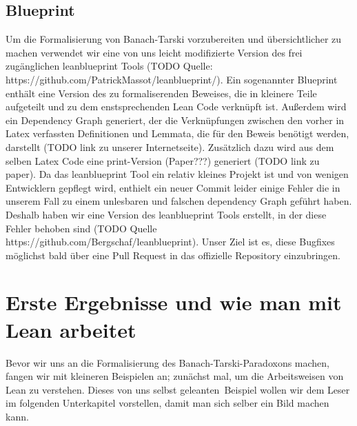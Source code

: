 \documentclass[10pt]{article}
\begin{document}
\subsection{Blueprint}
Um die Formalisierung von Banach-Tarski vorzubereiten und übersichtlicher zu machen verwendet wir eine von uns leicht modifizierte Version des frei zugänglichen leanblueprint Tools (TODO Quelle: https://github.com/PatrickMassot/leanblueprint/). Ein sogenannter Blueprint enthält eine Version des zu formaliserenden Beweises, die in kleinere Teile aufgeteilt und zu dem enstsprechenden Lean Code verknüpft ist. Außerdem wird ein Dependency Graph generiert, der die Verknüpfungen zwischen den vorher in Latex verfassten Definitionen und Lemmata, die für den Beweis benötigt werden, darstellt (TODO link zu unserer Internetseite). Zusätzlich dazu wird aus dem selben Latex Code eine print-Version (Paper???) generiert (TODO link zu paper). Da das leanblueprint Tool ein relativ kleines Projekt ist und von wenigen Entwicklern gepflegt wird, enthielt ein neuer Commit leider einige Fehler die in unserem Fall zu einem unlesbaren und falschen dependency Graph geführt haben. Deshalb haben wir eine Version des leanblueprint Tools erstellt, in der diese Fehler behoben sind (TODO Quelle https://github.com/Bergschaf/leanblueprint). Unser Ziel ist es, diese Bugfixes möglichst bald über eine Pull Request in das offizielle Repository einzubringen.



\section{Erste Ergebnisse und wie man mit Lean arbeitet}
Bevor wir uns an die Formalisierung des Banach-Tarski-Paradoxons machen, fangen wir mit kleineren Beispielen an; zunächst mal, um die Arbeitsweisen von Lean zu verstehen. Dieses von uns selbst \glqq geleanten\grqq~Beispiel wollen wir dem Leser im folgenden Unterkapitel vorstellen, damit man sich selber ein Bild machen kann.  
\end{document}

